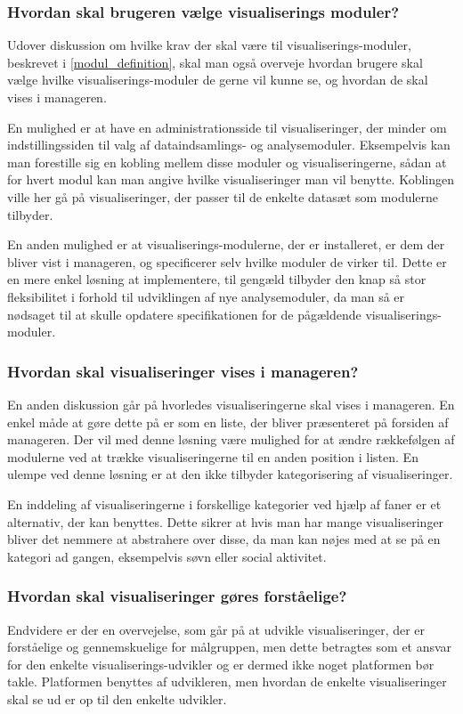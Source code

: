 \subsubsection{Hvordan skal brugeren vælge visualiserings moduler?}
Udover diskussion om hvilke krav der skal være til visualiserings-moduler, beskrevet i \cref{modul_definition}, skal man også overveje hvordan brugere skal vælge hvilke visualiserings-moduler de gerne vil kunne se, og hvordan de skal vises i manageren.

En mulighed er at have en administrationsside til visualiseringer, der minder om indstillingssiden til valg af dataindsamlings- og analysemoduler.
Eksempelvis kan man forestille sig en kobling mellem disse moduler og visualiseringerne, sådan at for hvert modul kan man angive hvilke visualiseringer man vil benytte.
Koblingen ville her gå på visualiseringer, der passer til de enkelte datasæt som modulerne tilbyder.

En anden mulighed er at visualiserings-modulerne, der er installeret, er dem der bliver vist i manageren, og specificerer selv hvilke moduler de virker til.
Dette er en mere enkel løsning at implementere, til gengæld tilbyder den knap så stor fleksibilitet i forhold til udviklingen af nye analysemoduler, da man så er nødsaget til at skulle opdatere specifikationen for de pågældende visualiserings-moduler.

\subsubsection{Hvordan skal visualiseringer vises i manageren?}
En anden diskussion går på hvorledes visualiseringerne skal vises i manageren.
En enkel måde at gøre dette på er som en liste, der bliver præsenteret på forsiden af manageren.
Der vil med denne løsning være mulighed for at ændre rækkefølgen af modulerne ved at trække visualiseringerne til en anden position i listen.
En ulempe ved denne løsning er at den ikke tilbyder kategorisering af visualiseringer.

En inddeling af visualiseringerne i forskellige kategorier ved hjælp af faner er et alternativ, der kan benyttes.
Dette sikrer at hvis man har mange visualiseringer bliver det nemmere at abstrahere over disse, da man kan nøjes med at se på en kategori ad gangen, eksempelvis søvn eller social aktivitet.

\subsubsection{Hvordan skal visualiseringer gøres forståelige?}
Endvidere er der en overvejelse, som går på at udvikle visualiseringer, der er forståelige og gennemskuelige for målgruppen, men dette betragtes som et ansvar for den enkelte visualiserings-udvikler og er dermed ikke noget platformen bør takle.
Platformen benyttes af udvikleren, men hvordan de enkelte visualiseringer skal se ud er op til den enkelte udvikler.

